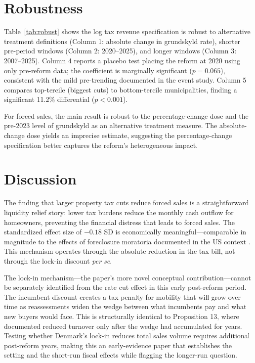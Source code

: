\documentclass[12pt]{article}
\begin{document}


\section{Robustness}

Table~\ref{tab:robust} shows the log tax revenue specification is robust to alternative treatment definitions (Column 1: absolute change in grundskyld rate), shorter pre-period windows (Column 2: 2020--2025), and longer windows (Column 3: 2007--2025). Column 4 reports a placebo test placing the reform at 2020 using only pre-reform data; the coefficient is marginally significant ($p = 0.065$), consistent with the mild pre-trending documented in the event study. Column 5 compares top-tercile (biggest cuts) to bottom-tercile municipalities, finding a significant 11.2\% differential ($p < 0.001$).

For forced sales, the main result is robust to the percentage-change dose and the pre-2023 level of grundskyld as an alternative treatment measure. The absolute-change dose yields an imprecise estimate, suggesting the percentage-change specification better captures the reform's heterogeneous impact.



\section{Discussion}

The finding that larger property tax cuts reduce forced sales is a straightforward liquidity relief story: lower tax burdens reduce the monthly cash outflow for homeowners, preventing the financial distress that leads to forced sales. The standardized effect size of $-0.18$ SD is economically meaningful---comparable in magnitude to the effects of foreclosure moratoria documented in the US context \citep{mian2015foreclosures}. This mechanism operates through the absolute reduction in the tax bill, not through the lock-in discount \textit{per se}.

The lock-in mechanism---the paper's more novel conceptual contribution---cannot be separately identified from the rate cut effect in this early post-reform period. The incumbent discount creates a tax penalty for mobility that will grow over time as reassessments widen the wedge between what incumbents pay and what new buyers would face. This is structurally identical to Proposition 13, where \citet{ferreira2010you} documented reduced turnover only after the wedge had accumulated for years. Testing whether Denmark's lock-in reduces total sales volume requires additional post-reform years, making this an early-evidence paper that establishes the setting and the short-run fiscal effects while flagging the longer-run question.
\end{document}
